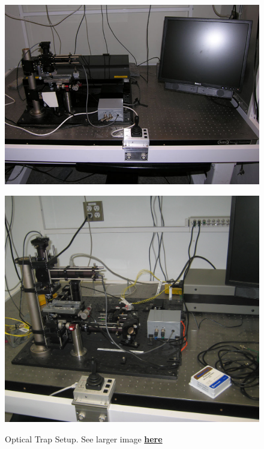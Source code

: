 \documentclass{../lab}
\begin{document}
\begin{figure}[H]
\begin{minipage}{0.32\textwidth}
    \href{http://experimentationlab.berkeley.edu/sites/default/files/images/OTZ_0141B.jpg}{\includegraphics[width=\linewidth,keepaspectratio]{images/OTZ_0141B.jpg}}
    \caption{Optical Trap Setup. See larger image \href{http://experimentationlab.berkeley.edu/sites/default/files/images/OTZ_0141B.jpg}{\textbf{here}}}
\end{minipage}
\begin{minipage}{0.32\textwidth}
    \href{http://experimentationlab.berkeley.edu/sites/default/files/images/OTZ_3551_Crop.jpg}{\includegraphics[width=\linewidth,keepaspectratio]{images/OTZ_3551_Crop.jpg}}

\end{minipage}
\end{figure}
\end{document}
